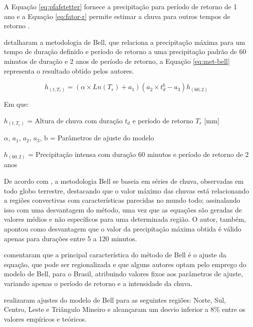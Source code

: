 \par A Equação \ref{eq:pfafstetter} fornece a precipitação para período de retorno de 1 ano e a Equação \ref{eq:fator-r} permite estimar a chuva para outros tempos de retorno \cite{tucci1993}.

 detalharam a metodologia de Bell, que relaciona a precipitação máxima para um tempo de duração definido e período de retorno a uma precipitação padrão de 60 minutos de duração e 2 anos de período de retorno, a Equação \ref{eq:met-bell} representa o resultado obtido pelos autores.

\begin{equation}
\label{eq:met-bell}
    h_{(t,T_r)} = (\alpha \times Ln(T_r) + a_1)(a_2 \times t_d^b - a_3)h_{(60,2)}
\end{equation}

Em que:

$h_{(t, T_r)}$ = Altura de chuva com duração $t_d$ e período de retorno $T_r$ [mm]

$\alpha$, $a_1$, $a_2$, $a_3$, b = Parâmetros de ajuste do modelo

$h_{(60,2)}$ = Precipitação intensa com duração 60 minutos e período de retorno de 2 anos \\

\par De acordo com , a metodologia Bell se baseia em séries de chuva, observadas em todo globo terrestre, destacando que o valor máximo das chuvas está relacionando a regiões convectivas com características parecidas no mundo todo; assinalando isso com uma desvantagem do método, uma vez que as equações são geradas de valores médios e não específicos para uma determinada região. O autor, também, apontou como desvantagem que o valor da precipitação máxima obtida é válido apenas para durações entre 5 a 120 minutos.

 comentaram que a principal característica do método de Bell é o ajuste da equação, que pode ser regionalizada e que alguns autores optam pelo emprego do modelo de Bell, para o Brasil, atribuindo valores fixos aos parâmetros de ajuste, variando apenas o período de retorno e a intensidade da chuva. %
    
 realizaram ajustes do modelo de Bell para as seguintes regiões: Norte, Sul, Centro, Leste e Triângulo Mineiro e alcançaram um desvio inferior a 8\% entre os valores empíricos e teóricos.

